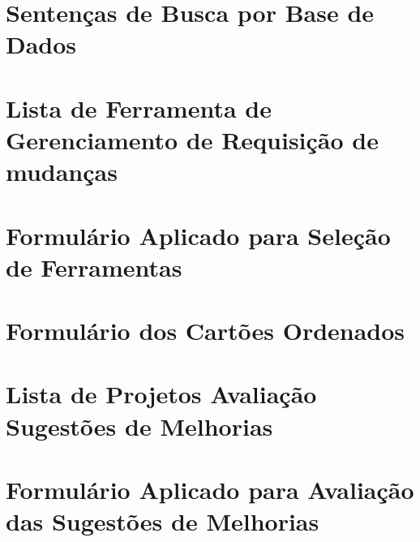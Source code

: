\begin{appendices}

\chapter{Sentenças de Busca por Base de Dados}
\label{ch:app-instrumentos-mapeamento}


\chapter{Lista de Ferramenta de Gerenciamento de Requisição de mudanças}
\label{ch:app-lista-fgrm}


\chapter{Formulário Aplicado para Seleção de Ferramentas}
\label{ch:app-form-selecao-ferramentas}


\chapter{Formulário dos Cartões Ordenados}
\label{ch:app-form-cartoes-ordenados}


\chapter{Lista de Projetos Avaliação Sugestões de Melhorias}
\label{ch:app-tb-lista-projetos-sug-melhorias}


\chapter{Formulário Aplicado para Avaliação das Sugestões de Melhorias}
\label{ch:app-form-sug-melhorias}


\end{appendices}